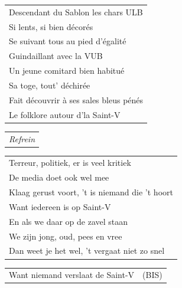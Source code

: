 \documentclass[a4paper, 14pt]{extarticle}
\begin{document}
\begin{flushleft}
\begin{tabularx}{0.8\textwidth} {
   >{\raggedright\arraybackslash}X}
Descendant du Sablon les chars ULB\\
Si lents, si bien décorés\\
Se suivant tous au pied d’égalité\\
Guindaillant avec la VUB\\
Un jeune comitard bien habitué\\
Sa toge, tout’ déchirée\\
Fait découvrir à ses sales bleus pénés\\
Le folklore autour d’la Saint-V\\
\end{tabularx}
\end{flushleft}\begin{flushleft}
\begin{tabularx}{0.8\textwidth} {
   >{\raggedright\arraybackslash}X}
   \textit{Refrein}
\end{tabularx}
\end{flushleft}\begin{flushleft}
\begin{tabularx}{0.8\textwidth} {
   >{\raggedright\arraybackslash}X}
Terreur, politiek, er is veel kritiek\\
De media doet ook wel mee\\
Klaag gerust voort, ’t is niemand die ’t hoort\\
Want iedereen is op Saint-V\\
En als we daar op de zavel staan\\
We zijn jong, oud, pees en vree\\
Dan weet je het wel, ’t vergaat niet zo snel\\
\end{tabularx}
\begin{tabularx}{0.8\textwidth} {
   >{\raggedright\arraybackslash}X c}
Want niemand verslaat de Saint-V & (BIS)\\
\end{tabularx}
\end{flushleft}
\end{document}
